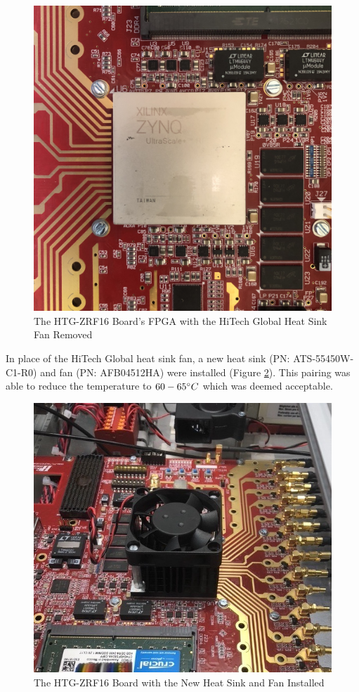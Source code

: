 \documentclass[12pt,a4paper,oneside]{article}
\begin{document}
%
\begin{figure}[H]
\centering
\includegraphics[width=.67\linewidth]{figures/FPGA.jpeg}
\caption{The HTG-ZRF16 Board's FPGA with the HiTech Global Heat Sink Fan Removed}
\label{fig:FPGA}
\end{figure}
%

In place of the HiTech Global heat sink fan, a new heat sink (PN: ATS-55450W-C1-R0) and fan (PN: AFB04512HA) were installed (Figure \ref{fig:New_heat_sink_fan}). This pairing was able to reduce the temperature to $60-65\degree C$ which was deemed acceptable. 

%
\begin{figure}[H]
\centering
\includegraphics[width=.8\linewidth]{figures/New_heatsink_fan.jpeg}
\caption{The HTG-ZRF16 Board with the New Heat Sink and Fan Installed}
\label{fig:New_heat_sink_fan}
\end{figure}
%
\end{document}
